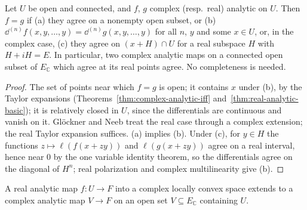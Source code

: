 \begin{theorem}
  \label{thm:identity}
  \leanok
  Let $U$ be open and connected, and $f$, $g$ complex (resp.\ real) analytic on $U$. Then $f = g$
  if (a) they agree on a nonempty open subset, or (b) $\dd^{(n)} f(x, y, \dots, y) =
  \dd^{(n)} g(x, y, \dots, y)$ for all $n$, $y$ and some $x \in U$, or, in the complex case,
  (c) they agree on $(x + H) \cap U$ for a real subspace $H$ with $H + iH = E$. In particular, two
  complex analytic maps on a connected open subset of $E_{\mathbb{C}}$ which agree at its real
  points agree. No completeness is needed.
\end{theorem}

\begin{proof}
  \leanok
  The set of points near which $f = g$ is open; it contains $x$ under (b), by the Taylor
  expansions (Theorems~\ref{thm:complex-analytic-iff} and~\ref{thm:real-analytic-basic}); it is
  relatively closed in $U$, since the differentials are continuous and vanish on it. Glöckner and
  Neeb treat the real case through a complex extension; the real Taylor expansion suffices.
  (a) implies (b). Under (c), for $y \in H$ the functions $z \mapsto \ell(f(x + zy))$ and
  $\ell(g(x + zy))$ agree on a real interval, hence near $0$ by the one variable identity theorem,
  so the differentials agree on the diagonal of $H^n$; real polarization and complex
  multilinearity give (b).
\end{proof}

\begin{proposition}
  \label{prop:complex-target}
  \leanok
  A real analytic map $f \colon U \to F$ into a complex locally convex space extends to a complex
  analytic map $V \to F$ on an open set $V \subseteq E_{\mathbb{C}}$ containing $U$.
\end{proposition}

